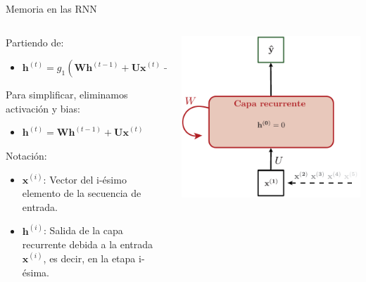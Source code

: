 \documentclass[aspectratio=169]{beamer}
\begin{document}
\begin{frame}{Memoria en las RNN}

	\begin{columns}
		\begin{column}{0.5\textwidth}
			Partiendo de:
			\begin{itemize}
				\item $\mathbf{h}^{(t)} = g_{1}(\mathbf{Wh}^{(t-1)}+\mathbf{Ux}^{(t)}+\mathbf{b}_{h})$
			\end{itemize}			
			Para simplificar, eliminamos activación y bias:
			\begin{itemize}
				\item $\mathbf{h}^{(t)} = \mathbf{Wh}^{(t-1)}+\mathbf{Ux}^{(t)}$
			\end{itemize}
			\vspace{1em}
			Notación:
			\begin{itemize}
			  \item $\mathbf{x}^{(i)}$: Vector del i-ésimo elemento de la secuencia de entrada.
			  \item $\mathbf{h}^{(i)}$: Salida de la capa recurrente debida a la entrada $\mathbf{x}^{(i)}$, es decir, en la etapa i-ésima.
			\end{itemize}
		\end{column}

		\begin{column}{0.5\textwidth}
			\begin{center}
				\includegraphics[width=.8\textwidth]{imgs/tema4/rnn/Memoria1.pdf}
			\end{center}
		\end{column}
	\end{columns}

\end{frame}
\end{document}

